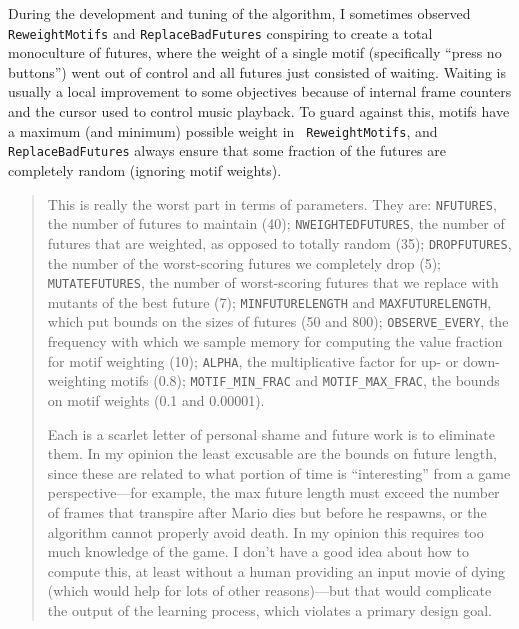 \documentclass[twocolumn]{article}
\newcommand\parameteralert[1]{
  \begin{quotation}
  \noindent {\bf Parameter Alert!} #1
  \end{quotation}
}
\begin{document}
During the development and tuning of the algorithm, I sometimes
observed {\tt ReweightMotifs} and {\tt ReplaceBadFutures} conspiring
to create a total monoculture of futures, where the weight of a single
motif (specifically ``press no buttons'') went out of control and all
futures just consisted of waiting. Waiting is usually a local
improvement to some objectives because of internal frame counters and
the cursor used to control music playback. To guard against this,
motifs have a maximum (and minimum) possible weight in {\tt
  ReweightMotifs}, and {\tt ReplaceBadFutures} always ensure that
some fraction of the futures are completely random (ignoring motif
weights).

\parameteralert{
  This is really the worst part in terms of parameters. They are: 
  {\tt NFUTURES}, the number of futures to maintain (40);
  {\tt NWEIGHTEDFUTURES}, the number of futures that are weighted,
  as opposed to totally random (35);
  {\tt DROPFUTURES}, the number of the worst-scoring futures we
  completely drop (5);
  {\tt MUTATEFUTURES}, the number of worst-scoring futures that
  we replace with mutants of the best future (7);
  {\tt MINFUTURELENGTH} and {\tt MAXFUTURELENGTH}, which put bounds
  on the sizes of futures (50 and 800);
  {\tt OBSERVE\_EVERY}, the frequency with which we sample memory
  for computing the value fraction for motif weighting (10);
  {\tt ALPHA}, the multiplicative factor for up- or down-weighting
  motifs (0.8);
  {\tt MOTIF\_MIN\_FRAC} and {\tt MOTIF\_MAX\_FRAC}, the bounds
  on motif weights (0.1 and 0.00001).
  
  Each is a scarlet letter of personal shame and future work is to
  eliminate them. In my opinion the least excusable are the bounds on
  future length, since these are related to what portion of time is
  ``interesting'' from a game perspective---for example, the max
  future length must exceed the number of frames that transpire after
  Mario dies but before he respawns, or the algorithm cannot properly
  avoid death. In my opinion this requires too much knowledge of the
  game. I don't have a good idea about how to compute this, at least
  without a human providing an input movie of dying (which would
  help for lots of other reasons)---but that would complicate the
  output of the learning process, which violates a primary design goal.
  
}
\end{document}
